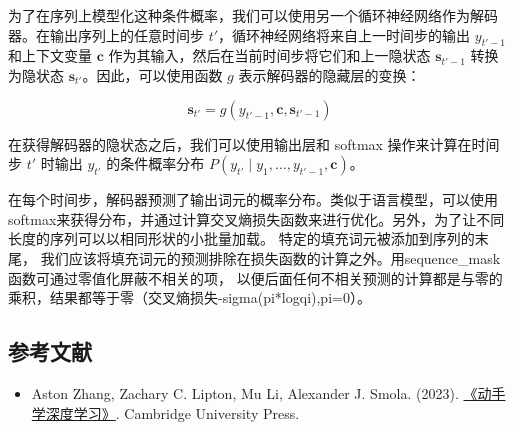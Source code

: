 为了在序列上模型化这种条件概率，我们可以使用另一个循环神经网络作为解码器。在输出序列上的任意时间步 \(t'\)，循环神经网络将来自上一时间步的输出 \(y_{t'-1}\) 和上下文变量 \(\mathbf{c}\) 作为其输入，然后在当前时间步将它们和上一隐状态 \(\mathbf{s}_{t'-1}\) 转换为隐状态 \(\mathbf{s}_{t'}\)。因此，可以使用函数 \(g\) 表示解码器的隐藏层的变换：

\[
\mathbf{s}_{t'} = g(y_{t'-1},\mathbf{c},\mathbf{s}_{t'-1})
\]

在获得解码器的隐状态之后，我们可以使用输出层和 softmax 操作来计算在时间步 \(t'\) 时输出 \(y_{t'}\) 的条件概率分布 \(P(y_{t'} \mid y_1,\ldots,y_{t'-1},\mathbf{c})\)。

在每个时间步，解码器预测了输出词元的概率分布。类似于语言模型，可以使用softmax来获得分布，并通过计算交叉熵损失函数来进行优化。另外，为了让不同长度的序列可以以相同形状的小批量加载。 特定的填充词元被添加到序列的末尾， 我们应该将填充词元的预测排除在损失函数的计算之外。用sequence\_mask函数可通过零值化屏蔽不相关的项， 以便后面任何不相关预测的计算都是与零的乘积，结果都等于零（交叉熵损失-sigma(pi*logqi),pi=0）。

\hypertarget{ux53c2ux8003ux6587ux732e-22}{%
\subsection{参考文献}\label{ux53c2ux8003ux6587ux732e-22}}

\begin{itemize}
\tightlist
\item
  Aston Zhang, Zachary C. Lipton, Mu Li, Alexander J. Smola. (2023). \href{https://zh.d2l.ai/}{《动手学深度学习》}. Cambridge University Press.
\end{itemize}

\clearpage
